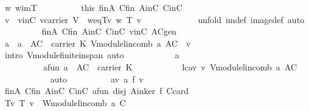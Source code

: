 \begin{isabellebody}
\ w{\isacharcolon}\ {\isachardoublequoteopen}w{\isasymin}imT{\isachardoublequoteclose}\isanewline
\ \ \ \ \ \ \ \ \isamarkupfalse%
\ this\ finA\ Cfin\ AinC\ CinC\ \isamarkupfalse%
\ v\ \ v{\isacharunderscore}inC{\isacharcolon}\ {\isachardoublequoteopen}v{\isasymin}carrier\ V{\isachardoublequoteclose}\ \ w{\isacharunderscore}eq{\isacharunderscore}T{\isacharunderscore}v{\isacharcolon}\ {\isachardoublequoteopen}w{\isacharequal}\ T\ v{\isachardoublequoteclose}\ \isanewline
\ \ \ \ \ \ \ \ \ \ \isamarkupfalse%
\ {\isacharparenleft}unfold\ im{\isacharunderscore}def\ image{\isacharunderscore}def{\isacharcomma}\ auto{\isacharparenright}\isanewline
\ \ \ \ \ \ \ \ \isamarkupfalse%
\ finA\ Cfin\ AinC\ CinC\ v{\isacharunderscore}inC\ ACgen\ \isamarkupfalse%
\ {\isachardoublequoteopen}{\isasymexists}a{\isachardot}\ \ a\ {\isasymin}\ A{\isasymunion}C\ {\isasymrightarrow}\ carrier\ K{\isasymand}\ V{\isachardot}module{\isachardot}lincomb\ a\ {\isacharparenleft}A{\isasymunion}C{\isacharparenright}\ {\isacharequal}\ v{\isachardoublequoteclose}\isanewline
\ \ \ \ \ \ \ \ \ \ \isamarkupfalse%
\ {\isacharparenleft}intro\ V{\isachardot}module{\isachardot}finite{\isacharunderscore}in{\isacharunderscore}span{\isacharcomma}\ auto{\isacharparenright}\isanewline
\ \ \ \ \ \ \ \ \isamarkupfalse%
\ \isamarkupfalse%
\ a\ \ \isanewline
\ \ \ \ \ \ \ \ \ \ a{\isacharunderscore}fun{\isacharcolon}\ {\isachardoublequoteopen}a\ {\isasymin}\ A{\isasymunion}C\ {\isasymrightarrow}\ carrier\ K{\isachardoublequoteclose}\ \isanewline
\ \ \ \ \ \ \ \ \ \ lc{\isacharunderscore}a{\isacharunderscore}v{\isacharcolon}\ {\isachardoublequoteopen}v{\isacharequal}\ V{\isachardot}module{\isachardot}lincomb\ a\ {\isacharparenleft}A{\isasymunion}C{\isacharparenright}{\isachardoublequoteclose}\isanewline
\ \ \ \ \ \ \ \ \ \ \isamarkupfalse%
\ auto\isanewline
\ \ \ \ \ \ \ \ \isamarkupfalse%
\ {\isacharquery}a{\isacharprime}{\isacharequal}{\isachardoublequoteopen}{\isasymlambda}v{\isachardot}\ a\ {\isacharparenleft}{\isacharquery}f\ v{\isacharparenright}{\isachardoublequoteclose}\isanewline
\ \ \ \ \ \ \ \ \isamarkupfalse%
\ finA\ Cfin\ AinC\ CinC\ a{\isacharunderscore}fun\ disj\ Ainker\ f\ C{\isacharprime}{\isacharunderscore}card\ \isamarkupfalse%
\ Tv{\isacharcolon}\ {\isachardoublequoteopen}T\ v\ {\isacharequal}\ W{\isachardot}module{\isachardot}lincomb\ {\isacharquery}a{\isacharprime}\ {\isacharquery}C{\isacharprime}{\isachardoublequoteclose}\isanewline

\end{isabellebody}
